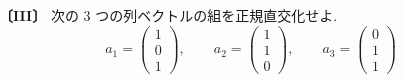\noindent\textbf{〔III〕}
次の 3 つの列ベクトルの組を正規直交化せよ.
\[
a_1=\begin{pmatrix}1\\0\\1\end{pmatrix},\qquad
a_2=\begin{pmatrix}1\\1\\0\end{pmatrix},\qquad
a_3=\begin{pmatrix}0\\1\\1\end{pmatrix}
\]

